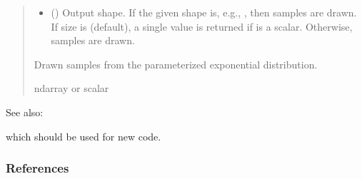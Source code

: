 \documentclass[letterpaper,10pt,english]{sphinxmanual}
\begin{document}
\begin{fulllineitems}
\begin{quote}
\begin{description}
\begin{itemize}
\item {} 
\sphinxAtStartPar
{} (\sphinxstyleliteralemphasis{\sphinxupquote{, }}) \textendash{} Output shape.  If the given shape is, e.g., , then
 samples are drawn.  If size is  (default),
a single value is returned if  is a scalar.  Otherwise,
 samples are drawn.

\end{itemize}

\sphinxAtStartPar
{} \textendash{} Drawn samples from the parameterized exponential distribution.

\sphinxAtStartPar
ndarray or scalar

\end{description}\end{quote}


\begin{sphinxseealso}{See also:}
\begin{description}
\sphinxAtStartPar
which should be used for new code.

\end{description}


\end{sphinxseealso}

\subsubsection*{References}

\end{fulllineitems}

\end{document}
